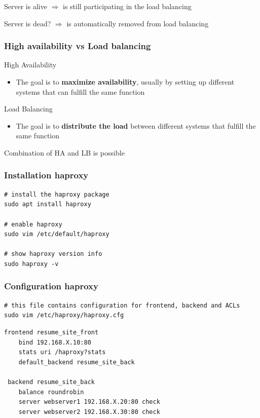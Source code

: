 \documentclass{article}
\begin{document}
Server is alive $\Rightarrow$ is still participating in the load balancing

Server is dead? $\Rightarrow$ is automatically removed from load balancing

\subsubsection{High availability vs Load balancing}

High Availability

\begin{itemize}
    \item The goal is to \textbf{maximize availability}, usually by setting up different systems that can fulfill the same function
\end{itemize}

Load Balancing

\begin{itemize}
    \item The goal is to \textbf{distribute the load} between different systems that fulfill the same function
\end{itemize}

Combination of HA and LB is possible

\subsubsection{Installation haproxy}

\begin{verbatim}
# install the haproxy package
sudo apt install haproxy

# enable haproxy
sudo vim /etc/default/haproxy

# show haproxy version info
sudo haproxy -v
\end{verbatim}

\subsubsection{Configuration haproxy}

\begin{verbatim}
# this file contains configuration for frontend, backend and ACLs
sudo vim /etc/haproxy/haproxy.cfg
\end{verbatim}

\begin{verbatim}
frontend resume_site_front
    bind 192.168.X.10:80
    stats uri /haproxy?stats
    default_backend resume_site_back
 
 backend resume_site_back
    balance roundrobin
    server webserver1 192.168.X.20:80 check
    server webserver2 192.168.X.30:80 check
\end{verbatim}
\end{document}
